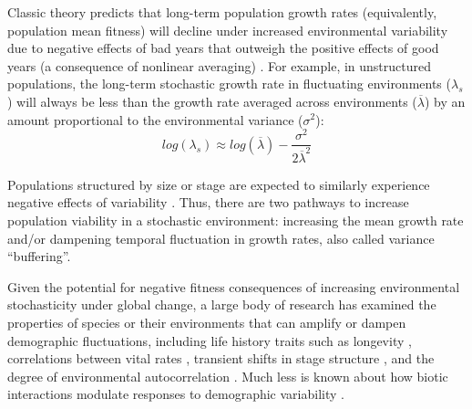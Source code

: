 \documentclass[12pt]{article}
\begin{document}
Classic theory predicts that long-term population growth rates (equivalently, population mean fitness) will decline under increased environmental variability due to negative effects of bad years that outweigh the positive effects of good years (a consequence of nonlinear averaging) \cite{lewontin_population_1969,tuljapurkar_population_1982}.
For example, in unstructured populations, the long-term stochastic growth rate in fluctuating environments ($\lambda_s$) will always be less than the growth rate averaged across environments ($\overline{\lambda}$) by an amount proportional to the environmental variance ($\sigma^2$): 
\begin{equation}
	 log(\lambda_s)  \approx log(\overline{\lambda}) - \frac{\sigma^2}{2\overline{\lambda}^2}
\end{equation}

Populations structured by size or stage are expected to similarly experience negative effects of variability \cite{cohen1979comparative,tuljapurkar2013population}.
Thus, there are two pathways to increase population viability in a stochastic environment: increasing the mean growth rate and/or dampening temporal fluctuation in growth rates, also called variance ``buffering''.

Given the potential for negative fitness consequences of increasing environmental stochasticity under global change, a large body of research has examined the properties of species or their environments that can amplify or dampen demographic fluctuations, including life history traits such as longevity \cite{morris2008longevity}, correlations between vital rates \cite{compagnoni2016effect}, transient shifts in stage structure \cite{ellis2013role}, and the degree of environmental autocorrelation \cite{tuljapurkar1980population,fieberg2001stochastic}. 
Much less is known about how biotic interactions modulate responses to demographic variability \cite{hilde_demographic_2020}. 
\end{document}
